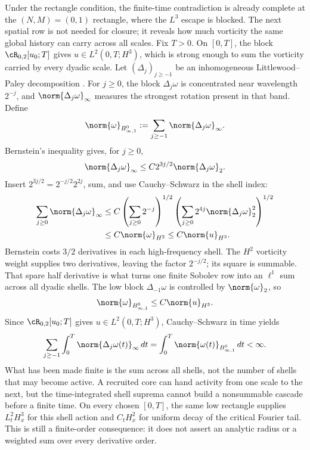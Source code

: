 Under the rectangle condition, the finite-time contradiction is already complete at the
\((N,M)=(0,1)\) rectangle, where the \(L^3\) escape is blocked.
The next spatial row is not needed for closure; it reveals how much vorticity the same global history can carry across all scales.
Fix \(T>0\).
On \([0,T]\), the block \(\cR_{0,2}[u_0;T]\) gives \(u\in L^2(0,T;H^3)\), which is strong enough to sum the vorticity carried by every dyadic scale.
Let \((\Delta_j)_{j\geq-1}\) be an inhomogeneous Littlewood--Paley decomposition \parencite[Chapter~2]{BahouriCheminDanchin2011}.
For \(j\geq0\), the block \(\Delta_j\omega\) is concentrated near wavelength \(2^{-j}\), and \(\norm{\Delta_j\omega}_\infty\) measures the strongest rotation present in that band.
Define
\[
  \norm{\omega}_{B^0_{\infty,1}}
  :=\sum_{j\geq-1}\norm{\Delta_j\omega}_\infty.
\]
Bernstein's inequality \parencite[Chapter~2]{BahouriCheminDanchin2011} gives, for \(j\geq0\),
\[
  \norm{\Delta_j\omega}_\infty
  \leq C2^{3j/2}\norm{\Delta_j\omega}_2.
\]
Insert \(2^{3j/2}=2^{-j/2}2^{2j}\), sum, and use Cauchy--Schwarz in the shell index:
\begin{align*}
  \sum_{j\geq0}\norm{\Delta_j\omega}_\infty
  &\leq
  C\left(\sum_{j\geq0}2^{-j}\right)^{1/2}
  \left(\sum_{j\geq0}2^{4j}\norm{\Delta_j\omega}_2^2\right)^{1/2}
  \\
  &\leq C\norm{\omega}_{H^2}
  \leq C\norm{u}_{H^3}.
\end{align*}
Bernstein costs \(3/2\) derivatives in each high-frequency shell.  The \(H^2\)
vorticity weight supplies two derivatives, leaving the factor \(2^{-j/2}\); its square
is summable.  That spare half derivative is what turns one finite Sobolev row into an
\(\ell^1\) sum across all dyadic shells.
The low block \(\Delta_{-1}\omega\) is controlled by \(\norm{\omega}_2\), so
\begin{equation}\label{eq:VorticityBesovFromHThree}
  \norm{\omega}_{B^0_{\infty,1}}
  \leq C\norm{u}_{H^3}.
\end{equation}
Since \(\cR_{0,2}[u_0;T]\) gives \(u\in L^2(0,T;H^3)\), Cauchy--Schwarz in time yields
\begin{equation}\label{eq:FiniteDyadicVorticityAction}
  \sum_{j\geq-1}
  \int_0^{T}\norm{\Delta_j\omega(t)}_\infty\,dt
  =\int_0^{T}\norm{\omega(t)}_{B^0_{\infty,1}}\,dt
  <\infty.
\end{equation}
What has been made finite is the sum across all shells, not the number of shells that
may become active.  A recruited core can hand activity from one scale to the next, but
the time-integrated shell suprema cannot build a nonsummable cascade before a finite
time.  On every chosen \([0,T]\), the same low rectangle supplies \(L^2_tH^3_x\) for
this shell action and \(C_tH^2_x\) for uniform decay of the critical Fourier tail.
This is still a finite-order consequence:
it does not assert an analytic radius or a weighted sum over every derivative order.

